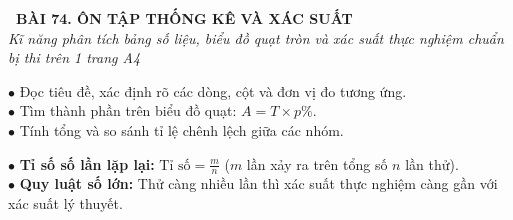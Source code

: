 \documentclass[14pt,a4paper,oneside]{extbook}
\begin{document}
\noindent
\begin{tcolorbox}[
  enhanced,
  colback=teal!8!white,
  colframe=teal!80!black,
  arc=3mm,
  boxrule=1.1pt,
  width=\linewidth,
  halign=center,
  top=2.2mm, bottom=2.2mm,
  left=3mm, right=3mm,
  drop fuzzy shadow
]
  {\large\bfseries\color{teal!95!black}\faBookmark\ BÀI 74. ÔN TẬP THỐNG KÊ VÀ XÁC SUẤT}\\[2pt]
  {\scriptsize\color{black!75}\itshape Kĩ năng phân tích bảng số liệu, biểu đồ quạt tròn và xác suất thực nghiệm chuẩn bị thi trên 1 trang A4}
\end{tcolorbox}

\vspace{3.2mm}
\noindent
\begin{minipage}[t]{0.54\textwidth}
  \begin{tcolorbox}[
    enhanced,
    title={\footnotesize\bfseries\color{white}\faTable\ 1. Đọc và phân tích số liệu},
    colback=blue!2!white,
    colframe=blue!75!black,
    arc=2.5mm, boxrule=0.8pt, top=1.8mm, bottom=1.8mm, left=2.2mm, right=2.2mm
  ]
    \footnotesize
    $\bullet$ Đọc tiêu đề, xác định rõ các dòng, cột và đơn vị đo tương ứng.\\
    $\bullet$ Tìm thành phần trên biểu đồ quạt: $A = T \times p\%$.\\
    $\bullet$ Tính tổng và so sánh tỉ lệ chênh lệch giữa các nhóm.
  \end{tcolorbox}
\end{minipage}%
\hfill
\begin{minipage}[t]{0.44\textwidth}
  \begin{tcolorbox}[
    enhanced,
    title={\footnotesize\bfseries\color{white}\faCubes\ 2. Xác suất thực nghiệm},
    colback=teal!2!white,
    colframe=teal!75!black,
    arc=2.5mm, boxrule=0.8pt, top=1.8mm, bottom=1.8mm, left=2mm, right=2mm
  ]
    \footnotesize
    $\bullet$ \textbf{Tỉ số số lần lặp lại:} $\text{Tỉ số} = \frac{m}{n}$ ($m$ lần xảy ra trên tổng số $n$ lần thử).\\
    $\bullet$ \textbf{Quy luật số lớn:} Thử càng nhiều lần thì xác suất thực nghiệm càng gần với xác suất lý thuyết.
  \end{tcolorbox}
\end{minipage}

\vspace{3mm}
\end{document}
